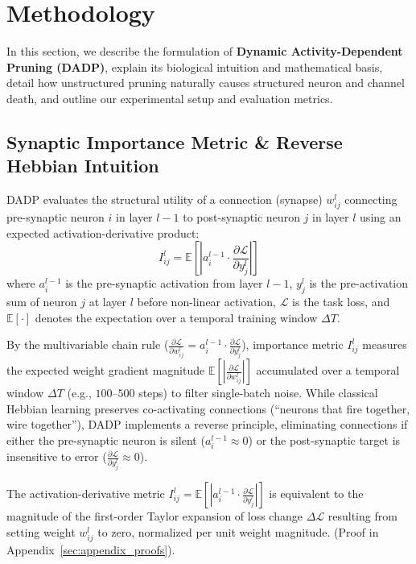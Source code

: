 \section{Methodology}

In this section, we describe the formulation of \textbf{Dynamic Activity-Dependent Pruning (DADP)}, explain its biological intuition and mathematical basis, detail how unstructured pruning naturally causes structured neuron and channel death, and outline our experimental setup and evaluation metrics.

\subsection{Synaptic Importance Metric \& Reverse Hebbian Intuition}

DADP evaluates the structural utility of a connection (synapse) $w_{ij}^l$ connecting pre-synaptic neuron $i$ in layer $l-1$ to post-synaptic neuron $j$ in layer $l$ using an expected activation-derivative product:
\begin{equation}
I_{ij}^l = \mathbb{E} \left[ \left| a_i^{l-1} \cdot \frac{\partial \mathcal{L}}{\partial y_j^l} \right| \right]
\end{equation}
where $a_i^{l-1}$ is the pre-synaptic activation from layer $l-1$, $y_j^l$ is the pre-activation sum of neuron $j$ at layer $l$ before non-linear activation, $\mathcal{L}$ is the task loss, and $\mathbb{E}[\cdot]$ denotes the expectation over a temporal training window $\Delta T$.

By the multivariable chain rule ($\frac{\partial \mathcal{L}}{\partial w_{ij}^l} = a_i^{l-1} \cdot \frac{\partial \mathcal{L}}{\partial y_j^l}$), importance metric $I_{ij}^l$ measures the expected weight gradient magnitude $\mathbb{E}\left[\left| \frac{\partial \mathcal{L}}{\partial w_{ij}^l} \right|\right]$ accumulated over a temporal window $\Delta T$ (e.g., $100$--$500$ steps) to filter single-batch noise. While classical Hebbian learning preserves co-activating connections (``neurons that fire together, wire together''), DADP implements a reverse principle, eliminating connections if either the pre-synaptic neuron is silent ($a_i^{l-1} \approx 0$) or the post-synaptic target is insensitive to error ($\frac{\partial \mathcal{L}}{\partial y_j^l} \approx 0$).

\begin{theorem}
\label{thm:taylor}
The activation-derivative metric $I_{ij}^l = \mathbb{E}[|a_i^{l-1} \cdot \frac{\partial \mathcal{L}}{\partial y_j^l}|]$ is equivalent to the magnitude of the first-order Taylor expansion of loss change $\Delta \mathcal{L}$ resulting from setting weight $w_{ij}^l$ to zero, normalized per unit weight magnitude. (Proof in Appendix~\ref{sec:appendix_proofs}).
\end{theorem}

